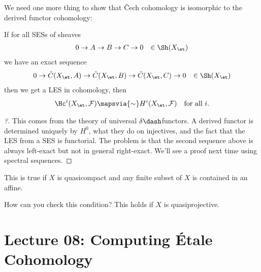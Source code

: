 We need one more thing to show that Čech cohomology is isomorphic to the
derived functor cohomology:

\begin{theorem}[?]

If for all SESs of sheaves
\begin{align*}  
0 \to A \to B \to C\to 0 && \in \Sh(X_\et)
\end{align*} we have an exact sequence
\begin{align*}  
0 \to \check{C}(X_\et, A) \to \check{C}(X_\et, B) \to \check{C}(X_\et,C) \to 0 && \in \Sh(X_\et)
\end{align*} then we get a LES in cohomology, then
\begin{align*}  
\Hc^{i}(X_\et, \mathcal{F}) \mapsvia{\sim} H^i(X_\et, \mathcal{F}) && \text{for all }i
.\end{align*}

\end{theorem}

\begin{proof}[?]

This comes from the theory of universal \(\delta\dash\)functors. A
derived functor is determined uniquely by \(H^0\), what they do on
injectives, and the fact that the LES from a SES is functorial. The
problem is that the second sequence above is always left-exact but not
in general right-exact. We'll see a proof next time using spectral
sequences.

\end{proof}

\begin{theorem}

This is true if \(X\) is quasicompact and any finite subset of \(X\) is
contained in an affine.

\end{theorem}

\begin{remark}

How can you check this condition? This holds if \(X\) is
quasiprojective.

\end{remark}

\hypertarget{lecture-08-computing-uxe9tale-cohomology}{%
\section{Lecture 08: Computing Étale
Cohomology}\label{lecture-08-computing-uxe9tale-cohomology}}

